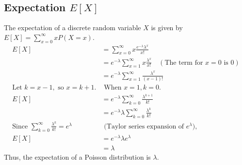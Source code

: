 \subsection{Expectation \(E[X]\)}
The expectation of a discrete random variable \(X\) is given by \(E[X] = \sum_{x=0}^{\infty} x P(X=x)\).
\begin{align*}
  E[X] &= \sum_{x=0}^{\infty} x \frac{e^{-\lambda} \lambda^x}{x!} \\
       &= e^{-\lambda} \sum_{x=1}^{\infty} x \frac{\lambda^x}{x!} \quad (\text{The term for } x=0 \text{ is } 0) \\
       &= e^{-\lambda} \sum_{x=1}^{\infty} \frac{\lambda^x}{(x-1)!} \\
  \text{Let } k = x-1, \text{ so } x = k+1. &\text{ When } x=1, k=0. \\
  E[X] &= e^{-\lambda} \sum_{k=0}^{\infty} \frac{\lambda^{k+1}}{k!} \\
       &= e^{-\lambda} \lambda \sum_{k=0}^{\infty} \frac{\lambda^k}{k!} \\
  \text{Since } \sum_{k=0}^{\infty} \frac{\lambda^k}{k!} = e^{\lambda} &\text{ (Taylor series expansion of } e^{\lambda}), \\
  E[X] &= e^{-\lambda} \lambda e^{\lambda} \\
       &= \lambda \label{eq:poisson_expectation}
\end{align*}
Thus, the expectation of a Poisson distribution is \(\lambda\).

